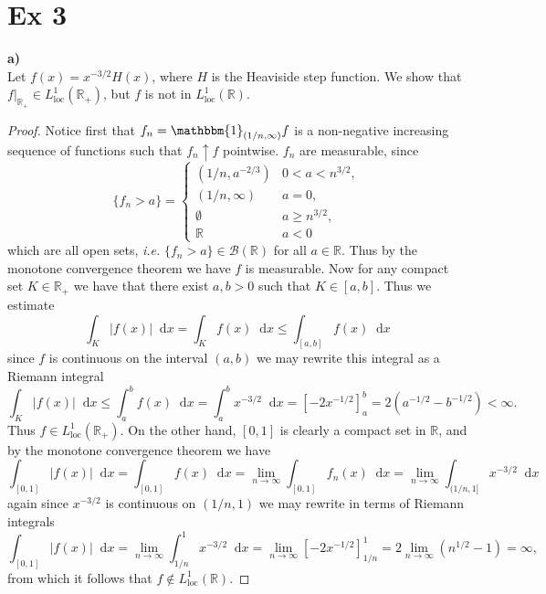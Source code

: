 \documentclass[a4paper,11pt]{article}
\newcommand{\abs}[1]{\left\lvert #1 \right\rvert}
\newcommand*\diff{\mathop{}\!\mathrm{d}}
\newcommand{\ie}{\emph{i.e.} }
\newcommand{\R}{\mathbb{R}}
\newcommand{\loc}{\text{loc}}
\numberwithin{equation}{section}
\begin{document}
\section*{Ex 3}
\textbf{a)}\\ Let $ f(x)=x^{-3/2}H(x) $, where $ H $ is the Heaviside step function. We show that $ f\lvert_{\R_+}\in L^1_{\loc}(\R_+) $, but $ f $ is not in $ L^1_\loc(\R) $.
\begin{proof}
	Notice first that $ f_n=\mathbbm{1}_{(1/n,\infty)}f $ is a non-negative increasing sequence of functions such that $ f_n\uparrow f $ pointwise. $ f_n $ are measurable, since \begin{equation}
	\{f_n>a\}=\begin{cases}
	(1/n,a^{-2/3})& 0< a<n^{3/2},\\
	(1/n,\infty)& a=0,\\
	\emptyset& a\geq n^{3/2},\\
	\R&a< 0
	\end{cases}
	\end{equation} which are all open sets, \ie $ \{f_n>a\}\in\mathcal{B}(\R) $ for all $ a\in\R $. Thus by the monotone convergence theorem we have  $ f $ is measurable. Now for any compact set $ K\in\R_+ $ we have that there exist $ a,b>0 $ such that $ K\in[a,b] $. Thus we estimate \begin{equation}
	\int_K \abs{f(x)} \diff x=\int_K f(x) \diff x\leq\int_{[a,b]}f(x) \diff x
	\end{equation}
	since $ f $ is continuous on the interval $ (a,b) $ we may rewrite this integral as a Riemann integral\begin{equation}
	\int_K \abs{f(x)} \diff x\leq \int_{a}^{b}f(x)\diff x=\int_{a}^{b}x^{-3/2}\diff x=\left[-2x^{-1/2}\right]_{a}^{b}=2(a^{-1/2}-b^{-1/2})<\infty.
	\end{equation}
	Thus $ f\in L^1_\loc(\R_+) $. On the other hand, $ [0,1] $ is clearly a compact set in $ \R $, and by the monotone convergence theorem we have \begin{equation}
	\int_{[0,1]}\abs{f(x)}\diff x=\int_{[0,1]}f(x)\diff x=\lim\limits_{n\to\infty}\int_{[0,1]}f_n(x)\diff x=\lim\limits_{n\to\infty}\int_{(1/n,1]}x^{-3/2}\diff x
	\end{equation}
	again since $ x^{-3/2} $ is continuous on $ (1/n,1) $ we may rewrite in terms of Riemann integrals \begin{equation}
	\int_{[0,1]}\abs{f(x)}\diff x=\lim\limits_{n\to\infty}\int_{1/n}^{1}x^{-3/2}\diff x=\lim\limits_{n\to\infty}\left[-2x^{-1/2}\right]_{1/n}^{1}=2\lim\limits_{n\to\infty}\left(n^{1/2}-1\right)=\infty,
	\end{equation}
	from which it follows that $ f\notin L^1_\loc(\R) $.
\end{proof}
\end{document}
